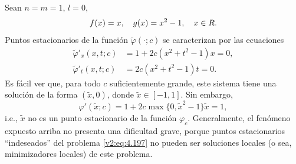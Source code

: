 \begin{example}\label{v2:exa:4.5.1}
    Sean $n = m = 1$, $l = 0$,
    \[
        f(x) = x, \quad g(x) = x^2 - 1, \quad x \in R.
    \]
    Puntos estacionarios de la función $\tilde{\varphi}(\cdot; c)$ se caracterizan por las ecuaciones
    \begin{align*}
        \tilde{\varphi}'_x(x, t; c) &= 1 + 2c(x^2 + t^2 - 1)x = 0, \\
        \tilde{\varphi}'_t(x, t; c) &= 2c(x^2 + t^2 - 1)t = 0.
    \end{align*}
    Es fácil ver que, para todo $c$ suficientemente grande, este sistema tiene una solución de la forma $(\tilde{x}, 0)$, donde $\tilde{x} \in [-1, 1]$.
    Sin embargo,
    \[
        \varphi'(\tilde{x}; c) = 1 + 2c \max\{0, \tilde{x}^2 - 1\}\tilde{x} = 1,
    \]
    i.e., $\tilde{x}$ no es un punto estacionario de la función $\varphi_c$.
    Generalmente, el fenómeno expuesto arriba no presenta una dificultad grave, porque puntos estacionarios ``indeseados'' del problema \eqref{v2:eq:4.197} no pueden ser soluciones locales (o sea, minimizadores locales) de este problema.
\end{example}


